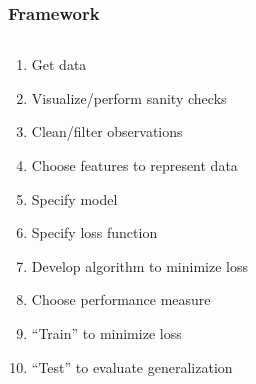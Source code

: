 \documentclass[xcolor=dvipsnames, 9pt]{beamer}
\begin{document}
\begin{frame}
  \frametitle{Framework}

  \begin{columns}
    \begin{column}{0.6\textwidth}
      
  \begin{enumerate}
    \item<1-> Get data
    \item<2-> Visualize/perform sanity checks
    \item<2-> Clean/filter observations
    \item<2-> Choose features to represent data
    \item<3-> Specify model
    \item<3-> Specify loss function 
    \item<4-> Develop algorithm to minimize loss 
    \item<5-> Choose performance measure
    \item<5-> ``Train'' to minimize loss
    \item<5-> ``Test'' to evaluate generalization
  \end{enumerate}

    \end{column}
    \begin{column}{0.3\textwidth}


\end{column}
\end{columns}
\end{frame}
\end{document}
